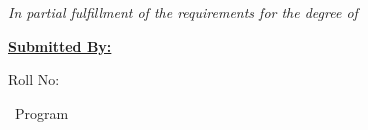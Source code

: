 \begin{titlepage}
{\fontsize{12}{14.5}\selectfont\itshape
In partial fulfillment of the requirements for the degree of \ProgramFullName\par}


{\bfseries\fontsize{13}{14.95}\selectfont\underline{Submitted By:}\par}
\vspace{3pt}
{\bfseries\fontsize{12}{14.5}\selectfont \ReportAuthor\par}
{\fontsize{12}{14.5}\selectfont Roll No: \SymbolNumber\par}
{\fontsize{12}{14.5}\selectfont \ProgramName\ Program\par}


{\bfseries\fontsize{12}{14.5}\selectfont \SubmissionMonthYear\par}

\end{titlepage}
